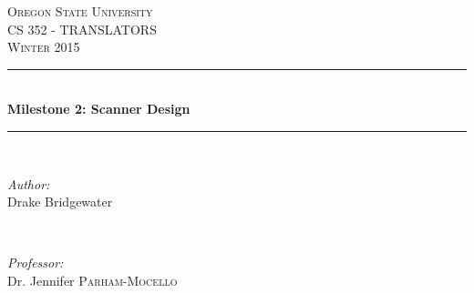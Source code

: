 \documentclass[letterpaper,10pt]{article}
\def\name{Drake Bridgewater }
\def\title{Milestone 2: Scanner Design}
\def\subject{CS }
\def\courseNumber{352 }
\def\courseName{TRANSLATORS }
\def\courseInfo{Winter 2015 }%
\def\supervisor{Dr. Jennifer \textsc{Parham-Mocello }} %
\begin{document}
\begin{titlepage}

\newcommand{\HRule}{\rule{\linewidth}{0.5mm}} %

\center %
 

\textsc{\LARGE Oregon State University}\\[1.5cm] %
\textsc{\Large \subject \courseNumber - \courseName}\\[0.5cm] %
\textsc{\large \courseInfo}\\[1.5cm] %


\HRule \\[0.4cm]
{ \huge \bfseries \title }\\[0.4cm] %
\HRule \\[7.5cm]
 

\begin{minipage}{0.4\textwidth}
\begin{flushleft} \large
\emph{Author:}\\
\name
\end{flushleft}
\end{minipage}
~
\begin{minipage}{0.4\textwidth}
\begin{flushright} \large
\emph{Professor:} \\
\supervisor
\end{flushright}
\end{minipage}\\[4cm]



\end{titlepage}
\end{document}
